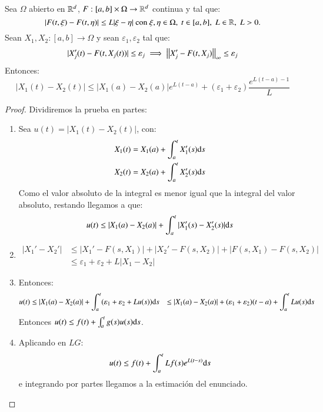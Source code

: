 \begin{pro}
    Sea $\Omega$ abierto en $\mathbb{R}^d$, $F:[a, b] \times \Omega \to \mathbb{R}^d$ continua y tal que:
    $$
            |F(t, \xi) - F(t, \eta)| \leq  L |\xi - \eta| \text{ con } \xi, \eta \in \Omega,\ t\in[a, b],\ L\in \R,\ L > 0.
    $$
    Sean $X_1, X_2 :[a, b] \to \Omega$ y sean $\varepsilon_1, \varepsilon_2$ tal que:
    $$
        |X_j'(t) - F(t, X_j(t))| \leq \varepsilon_j \implies \left|\left|X'_j - F(t, X_j)\right|\right|_\infty \leq \varepsilon_j
    $$
    Entonces:
    $$
        |X_1(t) - X_2(t) | \leq |X_1(a) - X_2(a)| e^{L(t-a)} + (\varepsilon_1 + \varepsilon_2) \frac{e^{L(t-a) - 1}}{L}
    $$
\end{pro}
\begin{proof}
    Dividiremos la prueba en partes:
    \begin{enumerate}
        \item Sea $u(t) = |X_1(t) - X_2(t)|$, con:
        \begin{gather*}
            X_1(t) = X_1(a) + \int_a^t X_1'(s) \mathrm{d} s\\
            X_2(t) = X_2(a) + \int_a^t X_2'(s) \mathrm{d} s
        \end{gather*}
        Como el valor absoluto de la integral es menor igual que la integral del valor absoluto, restando llegamos a que:
        $$
            u(t) \leq |X_1(a) - X_2(a)| + \int_a^t |X_1'(s) - X_2'(s)| \mathrm{d} s
        $$
        \item
        \begin{align*}
            |X_1' - X_2'| &\leq |X_1' - F(s, X_1)| + |X_2' - F(s, X_2)| + |F(s, X_1) - F(s, X_2)|\\
            &\leq \varepsilon_1 + \varepsilon_2 + L|X_1 - X_2|
        \end{align*}
        \item Entonces:
        \begin{align*}
            u(t) &\leq |X_1(a) - X_2(a)| + \int_a^t (\varepsilon_1 + \varepsilon_2 + L u(s) ) \mathrm{d} s
                 &\leq |X_1(a) - X_2(a)| + (\varepsilon_1 + \varepsilon_2)(t-a) + \int_a^t L u(s) \mathrm{d} s
        \end{align*}
        Entonces $u(t) \leq f(t) + \int_a^t g(s) u(s) \mathrm{d} s$.
        \item Aplicando en $LG$:
        $$
            u(t) \leq f(t) + \int_a^t L f(s) e^{L(t-s)} \mathrm{d} s
        $$
        e integrando por partes llegamos a la estimación del enunciado.
    \end{enumerate}
\end{proof}
